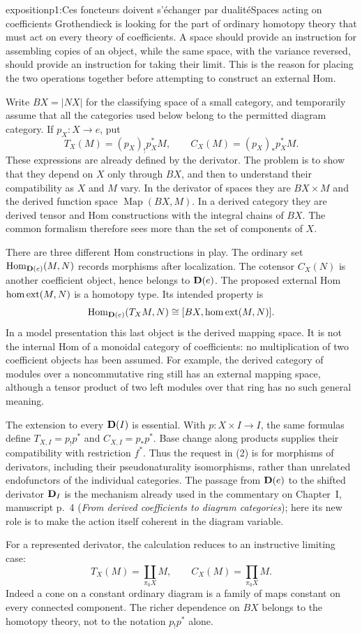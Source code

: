 \begin{dcomment}{exposition}{p1:Ces foncteurs doivent s'échanger par dualité}{Spaces acting on coefficients}
Grothendieck is looking for the part of ordinary homotopy theory that must act on every theory of coefficients. A space should provide an instruction for assembling copies of an object, while the same space, with the variance reversed, should provide an instruction for taking their limit. This is the reason for placing the two operations together before attempting to construct an external Hom.

Write \(B X=|N X|\) for the classifying space of a small category, and temporarily assume that all the categories used below belong to the permitted diagram category. If \(p_X:X\to e\), put
\[
 T_X(M)=(p_X)_!p_X^*M,\qquad
 C_X(M)=(p_X)_*p_X^*M.
\]
These expressions are already defined by the derivator. The problem is to show that they depend on \(X\) only through \(B X\), and then to understand their compatibility as \(X\) and \(M\) vary. In the derivator of spaces they are \(B X\times M\) and the derived function space \(\operatorname{Map}(B X,M)\). In a derived category they are derived tensor and Hom constructions with the integral chains of \(B X\). The common formalism therefore sees more than the set of components of \(X\).

There are three different Hom constructions in play. The ordinary set \(\mathrm{Hom}_{\mathbf{D}(e)}(M,N)\) records morphisms after localization. The cotensor \(C_X(N)\) is another coefficient object, hence belongs to \(\mathbf{D}(e)\). The proposed external Hom \(\mathrm{hom}\,\mathrm{ext}(M,N)\) is a homotopy type. Its intended property is
\[
 \mathrm{Hom}_{\mathbf{D}(e)}(T_XM,N)
 \cong [B X,\mathrm{hom}\,\mathrm{ext}(M,N)].
\]
In a model presentation this last object is the derived mapping space. It is not the internal Hom of a monoidal category of coefficients: no multiplication of two coefficient objects has been assumed. For example, the derived category of modules over a noncommutative ring still has an external mapping space, although a tensor product of two left modules over that ring has no such general meaning.

The extension to every \(\mathbf{D}(I)\) is essential. With \(p:X\times I\to I\), the same formulas define \(T_{X,I}=p_!p^*\) and \(C_{X,I}=p_*p^*\). Base change along products supplies their compatibility with restriction \(f^*\). Thus the request in (2) is for morphisms of derivators, including their pseudonaturality isomorphisms, rather than unrelated endofunctors of the individual categories. The passage from \(\mathbf{D}(e)\) to the shifted derivator \(\mathbf{D}_I\) is the mechanism already used in the commentary on Chapter~I, manuscript p.~4 (\emph{From derived coefficients to diagram categories}); here its new role is to make the action itself coherent in the diagram variable.

For a represented derivator, the calculation reduces to an instructive limiting case:
\[
 T_X(M)=\coprod_{\pi_0 X}M,\qquad
 C_X(M)=\prod_{\pi_0 X}M.
\]
Indeed a cone on a constant ordinary diagram is a family of maps constant on every connected component. The richer dependence on \(B X\) belongs to the homotopy theory, not to the notation \(p_!p^*\) alone.
\end{dcomment}


